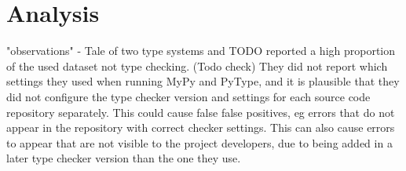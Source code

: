 \chapter{Analysis\label{analysis}}


"observations"
- Tale of two type systems and TODO reported a high proportion of the used dataset not type checking. (Todo check) They did not report which settings they used when running MyPy and PyType, and it is plausible that they did not configure the type checker version and settings for each source code repository separately. This could cause false false positives, eg errors that do not appear in the repository with correct checker settings. This can also cause errors to appear that are not visible to the project developers, due to being added in a later type checker version than the one they use. 
